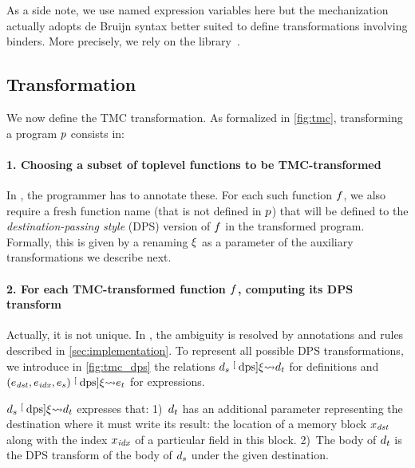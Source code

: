 As a side note, we use named expression variables here but the \Coq mechanization actually adopts de Bruijn syntax better suited to define transformations involving binders.
More precisely, we rely on the \Autosubst library~\cite{DBLP:conf/itp/SchaferTS15}.






\subsection{Transformation}

We now define the TMC transformation.
As formalized in \cref{fig:tmc}, transforming a \DataLang program $\datalangProg$ consists in:

\paragraph{1. Choosing a subset of toplevel functions to be TMC-transformed}
In \OCaml, the programmer has to annotate these.
For each such function $\datalangFn$, we also require a fresh function name (that is not defined in $\datalangProg$) that will be defined to the \emph{destination-passing style} (DPS) version of $\datalangFn$ in the transformed program.
Formally, this is given by a renaming $\xi$ as a parameter of the auxiliary transformations we describe next.

\paragraph{2. For each TMC-transformed function $\datalangFn$, computing its DPS transform}
Actually, it is not unique.
In \OCaml, the ambiguity is resolved by annotations and rules described in \cref{sec:implementation}.
To represent all possible DPS transformations, we introduce in \cref{fig:tmc_dps} the relations $\datalangDef_s \tmcDps{\datalangRenaming} \datalangDef_t$ for definitions and $(\datalangExpr_\mathit{dst}, \datalangExpr_\mathit{idx}, \datalangExpr_s) \tmcDps{\datalangRenaming} \datalangExpr_t$ for expressions.

$\datalangDef_s \tmcDps{\datalangRenaming} \datalangDef_t$ expresses that:
1)~$\datalangDef_t$ has an additional parameter representing the destination where it must write its result: the location of a memory block $\datalangVar_\mathit{dst}$ along with the index $\datalangVar_\mathit{idx}$ of a particular field in this block.
2)~The body of $\datalangDef_t$ is the DPS transform of the body of $\datalangDef_s$ under the given destination.

